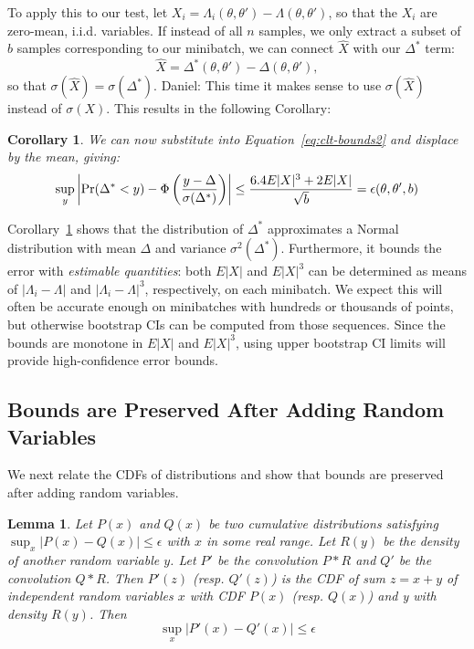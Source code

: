 \documentclass{article}
\newtheorem{lemma}{Lemma}
\newtheorem{corollary}{Corollary}
\begin{document}
To apply this to our test, let $X_i = \Lambda_i(\theta,\theta') -
\Lambda(\theta,\theta')$, so that the $X_i$ are zero-mean, i.i.d. variables. If
instead of all $n$ samples, we only extract a subset of $b$ samples
corresponding to our minibatch, we can connect $\hat{X}$ with our $\Delta^*$
term:
\begin{equation}\label{eq:x-hat}
    \hat{X} = \Delta^*(\theta,\theta') - \Delta(\theta,\theta'),
\end{equation}
so that $\sigma(\hat{X}) = \sigma(\Delta^*)$. {\color{blue} Daniel: This time it
makes sense to use $\sigma(\hat{X})$ instead of $\sigma(X)$.} This results in
the following Corollary:

\begin{corollary}\label{cor:our_bound_delta_prime}
We can now substitute into Equation~\ref{eq:clt-bounds2} and displace by the mean, giving:
\begin{equation}\label{eq:clt-bounds3}
    \sup_y\left|{\rm Pr}(\Delta^*< y) - \Phi\left(\frac{y-\Delta}{\sigma(\Delta^*)}\right)\right| \leq \frac{6.4E|X|^3+2E|X|}{\sqrt{b}} = \epsilon(\theta,\theta',b)
\end{equation}
\end{corollary}

Corollary~\ref{cor:our_bound_delta_prime} shows that the distribution of
$\Delta^*$ approximates a Normal distribution with mean $\Delta$ and variance
$\sigma^2(\Delta^*)$. Furthermore, it bounds the error with \emph{estimable
quantities}: both $E|X|$ and $E|X|^3$ can be determined as means of $|\Lambda_i
- \Lambda|$ and $|\Lambda_i - \Lambda|^3$, respectively, on each minibatch. We
expect this will often be accurate enough on minibatches with hundreds or
thousands of points, but otherwise bootstrap CIs can be computed from those
sequences. Since the bounds are monotone in $E|X|$ and $E|X|^3$, using upper
bootstrap CI limits will provide high-confidence error bounds.



\subsection{Bounds are Preserved After Adding Random Variables}\label{ssec:preserve_bounds}

We next relate the CDFs of distributions and show that bounds are preserved
after adding random variables.

\begin{lemma}\label{lem:cdf_bounds}
Let $P(x)$ and $Q(x)$ be two cumulative distributions satisfying
$\sup_x|P(x)-Q(x)|\leq \epsilon$ with $x$ in some real range. Let $R(y)$ be the
{\em density} of another random variable $y$. Let $P'$ be the convolution $P*R$
and $Q'$ be the convolution $Q*R$. Then $P'(z)$ (resp. $Q'(z)$) is the CDF of
sum $z=x+y$ of independent random variables $x$ with CDF $P(x)$ (resp. $Q(x)$)
and y with density $R(y)$.  Then
\begin{equation}
    \sup_x|P'(x)-Q'(x)|\leq \epsilon
\end{equation}
\end{lemma}
\end{document}

